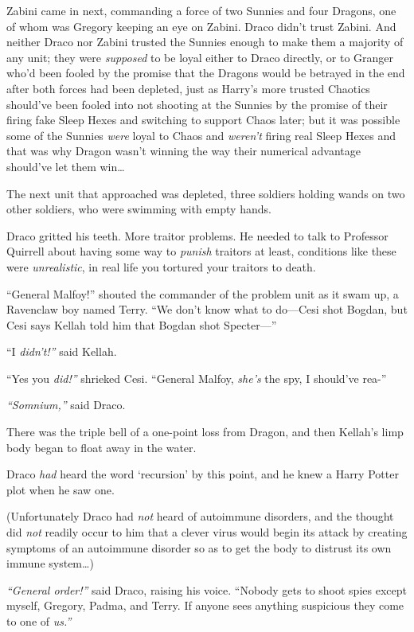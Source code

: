 Zabini came in next, commanding a force of two Sunnies and four Dragons,
one of whom was Gregory keeping an eye on Zabini. Draco didn't trust
Zabini. And neither Draco nor Zabini trusted the Sunnies enough to make
them a majority of any unit; they were \emph{supposed} to be loyal
either to Draco directly, or to Granger who'd been fooled by the promise
that the Dragons would be betrayed in the end after both forces had been
depleted, just as Harry's more trusted Chaotics should've been fooled
into not shooting at the Sunnies by the promise of their firing fake
Sleep Hexes and switching to support Chaos later; but it was possible
some of the Sunnies \emph{were} loyal to Chaos and \emph{weren't} firing
real Sleep Hexes and that was why Dragon wasn't winning the way their
numerical advantage should've let them win\ldots{}

The next unit that approached was depleted, three soldiers holding wands
on two other soldiers, who were swimming with empty hands.

Draco gritted his teeth. More traitor problems. He needed to talk to
Professor Quirrell about having some way to \emph{punish} traitors at
least, conditions like these were \emph{unrealistic}, in real life you
tortured your traitors to death.

``General Malfoy!'' shouted the commander of the problem unit as it swam
up, a Ravenclaw boy named Terry. ``We don't know what to do---Cesi shot
Bogdan, but Cesi says Kellah told him that Bogdan shot Specter---''

``I \emph{didn't!''} said Kellah.

``Yes you \emph{did!''} shrieked Cesi. ``General Malfoy, \emph{she's}
the spy, I should've rea-''

\emph{``Somnium,''} said Draco.

There was the triple bell of a one-point loss from Dragon, and then
Kellah's limp body began to float away in the water.

Draco \emph{had} heard the word `recursion' by this point, and he knew a
Harry Potter plot when he saw one.

(Unfortunately Draco had \emph{not} heard of autoimmune disorders, and
the thought did \emph{not} readily occur to him that a clever virus
would begin its attack by creating symptoms of an autoimmune disorder so
as to get the body to distrust its own immune system\ldots{})

\emph{``General order!''} said Draco, raising his voice. ``Nobody gets
to shoot spies except myself, Gregory, Padma, and Terry. If anyone sees
anything suspicious they come to one of \emph{us.''}

